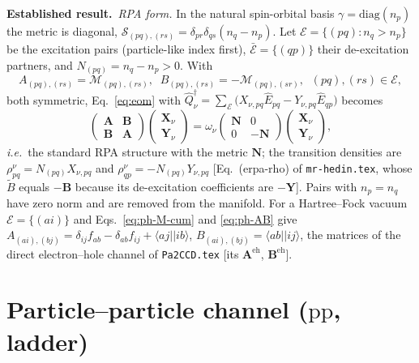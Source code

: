 \documentclass[aip,jcp,reprint,noshowkeys,superscriptaddress]{revtex4-1}
\newcommand{\ie}{\textit{i.e.}}
\newcommand{\bA}{\boldsymbol{A}}
\newcommand{\bB}{\boldsymbol{B}}
\newcommand{\bN}{\boldsymbol{N}}
\newcommand{\bX}{\boldsymbol{X}}
\newcommand{\bY}{\boldsymbol{Y}}
\newcommand{\eh}{\text{eh}}
\newcommand{\pp}{\text{pp}}
\newcommand{\Established}{\textbf{Established result.}\ }
\begin{document}
\Established \emph{RPA form.}  In the natural spin-orbital basis
$\gamma=\mathrm{diag}(n_p)$ the metric is diagonal,
$\mathcal S_{(pq),(rs)}=\delta_{pr}\delta_{qs}(n_q-n_p)$.  Let
$\mathcal E=\{(pq):n_q>n_p\}$ be the excitation pairs (particle-like index
first), $\bar{\mathcal E}=\{(qp)\}$ their de-excitation partners, and
$N_{(pq)}=n_q-n_p>0$.  With
\begin{equation}
  A_{(pq),(rs)}=\mathcal M_{(pq),(rs)},\;\;
  B_{(pq),(rs)}=-\mathcal M_{(pq),(sr)},\;\; (pq),(rs)\in\mathcal E,
  \label{eq:ph-AB}
\end{equation}
both symmetric, Eq.~\eqref{eq:eom} with
$\hat Q^\dagger_\nu=\sum_{\mathcal E}\bigl(X_{\nu,pq}\hat E_{pq}-Y_{\nu,pq}\hat E_{qp}\bigr)$
becomes
\begin{equation}
  \begin{pmatrix}\bA&\bB\\ \bB&\bA\end{pmatrix}
  \begin{pmatrix}\bX_\nu\\ \bY_\nu\end{pmatrix}
  =\omega_\nu
  \begin{pmatrix}\bN&0\\0&-\bN\end{pmatrix}
  \begin{pmatrix}\bX_\nu\\ \bY_\nu\end{pmatrix},
  \label{eq:ph-rpa}
\end{equation}
\ie\ the standard RPA structure with the metric $\bN$; the transition
densities are $\rho^{\nu}_{pq}=N_{(pq)}X_{\nu,pq}$ and
$\rho^{\nu}_{qp}=-N_{(pq)}Y_{\nu,pq}$ [Eq.~(erpa-rho) of
\texttt{mr-hedin.tex}, whose $\tilde B$ equals $-\bB$ because its
de-excitation coefficients are $-\bY$].  Pairs with $n_p=n_q$ have zero norm and
are removed from the manifold.  For a Hartree--Fock vacuum $\mathcal E=\{(ai)\}$
and Eqs.~\eqref{eq:ph-M-cum} and \eqref{eq:ph-AB} give
$A_{(ai),(bj)}=\delta_{ij}f_{ab}-\delta_{ab}f_{ij}+\langle aj||ib\rangle$,
$B_{(ai),(bj)}=\langle ab||ij\rangle$, the matrices of the direct
electron--hole channel of \texttt{Pa2CCD.tex} [its $\bA^{\eh}$, $\bB^{\eh}$].

\section{Particle--particle channel (\texorpdfstring{$\pp$}{pp}, ladder)}
\label{sec:pp}
\end{document}
